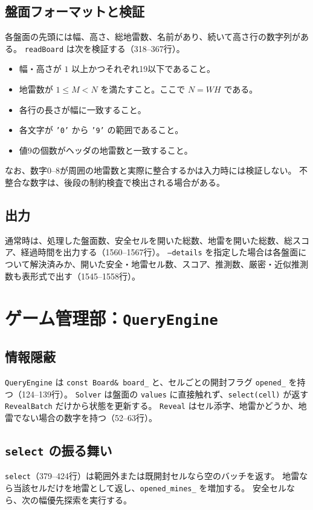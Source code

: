 \documentclass[uplatex,dvipdfmx,11pt]{jsarticle}
\newcommand{\code}[1]{\texttt{#1}}
\begin{document}
\subsection{盤面フォーマットと検証}
各盤面の先頭には幅、高さ、総地雷数、名前があり、続いて高さ行の数字列がある。
\code{readBoard} は次を検証する（318--367行）。

\begin{itemize}
  \item 幅・高さが $1$ 以上かつそれぞれ19以下であること。
  \item 地雷数が $1\le M<N$ を満たすこと。ここで $N=WH$ である。
  \item 各行の長さが幅に一致すること。
  \item 各文字が \code{'0'} から \code{'9'} の範囲であること。
  \item 値9の個数がヘッダの地雷数と一致すること。
\end{itemize}

なお、数字0--8が周囲の地雷数と実際に整合するかは入力時には検証しない。
不整合な数字は、後段の制約検査で検出される場合がある。

\subsection{出力}
通常時は、処理した盤面数、安全セルを開いた総数、地雷を開いた総数、総スコア、経過時間を出力する（1560--1567行）。
\code{--details} を指定した場合は各盤面について解決済みか、開いた安全・地雷セル数、スコア、推測数、厳密・近似推測数も表形式で出す（1545--1558行）。

\section{ゲーム管理部：\code{QueryEngine}}

\subsection{情報隠蔽}
\code{QueryEngine} は \code{const Board\& board\_} と、セルごとの開封フラグ \code{opened\_} を持つ（124--139行）。
\code{Solver} は盤面の \code{values} に直接触れず、\code{select(cell)} が返す \code{RevealBatch} だけから状態を更新する。
\code{Reveal} はセル添字、地雷かどうか、地雷でない場合の数字を持つ（52--63行）。

\subsection{\code{select} の振る舞い}
\code{select}（379--424行）は範囲外または既開封セルなら空のバッチを返す。
地雷なら当該セルだけを地雷として返し、\code{opened\_mines\_} を増加する。
安全セルなら、次の幅優先探索を実行する。
\end{document}
